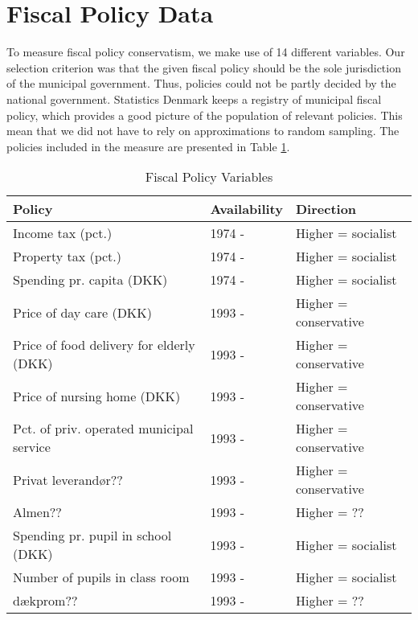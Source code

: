 \documentclass[12pt,a4]{article}
\begin{document}
	
\section*{Fiscal Policy Data}

To measure fiscal policy conservatism, we make use of 14 different variables. Our selection criterion was that the given fiscal policy should be the sole jurisdiction of the municipal government. Thus, policies could not be partly decided by the national government. Statistics Denmark keeps a registry of municipal fiscal policy, which provides a good picture of the population of relevant policies. This mean that we did not have to rely on approximations to random sampling. The policies included in the measure are presented in Table \ref{tab:policies}.

\begin{table}[h]
	\centering
	\caption{Fiscal Policy Variables}
	\label{tab:policies}
	\begin{tabular}{lll}
		\textbf{Policy}                          & \textbf{Availability} & \textbf{Direction} \\
		\hline
		Income tax (pct.)                        & 1974 -     &    Higher = socialist        \\
		Property tax (pct.)                      & 1974 -     &    Higher = socialist        \\
		Spending pr. capita (DKK)                & 1974 -     &    Higher = socialist        \\
		Price of day care (DKK)                  & 1993 -     &    Higher = conservative     \\
		Price of food delivery for elderly (DKK) & 1993 -     &    Higher = conservative     \\
		Price of nursing home (DKK)              & 1993 -     &    Higher = conservative     \\
		Pct. of priv. operated municipal service & 1993 -     &    Higher = conservative     \\
		Privat leverandør??                      & 1993 -     &    Higher = conservative     \\
		Almen??                                  & 1993 -     &    Higher = ??               \\
		Spending pr. pupil in school (DKK)       & 1993 -     &    Higher = socialist        \\
		Number of pupils in class room           & 1993 -     &    Higher = socialist        \\
		dækprom??                                & 1993 -     &    Higher = ??               \\

\end{tabular}
\end{table}
\end{document}
